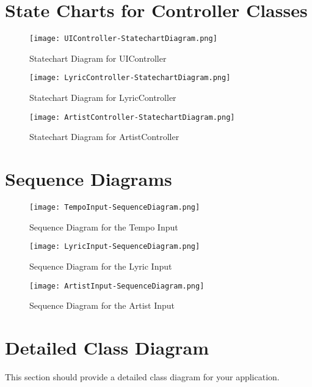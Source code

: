 \documentclass[]{article}
\begin{document}
\section{State Charts for Controller Classes}
\label{sec:state_charts_for_controller_classes}
\begin{figure}
	\centering
	\texttt{[image: UIController-StatechartDiagram.png]}
	\caption{Statechart Diagram for UIController}
	\label{fig:uicontroller_statechart}
\end{figure}
\begin{figure}
	\centering
	\texttt{[image: LyricController-StatechartDiagram.png]}
	\caption{Statechart Diagram for LyricController}
	\label{fig:uicontroller_statechart}
\end{figure}
\begin{figure}
	\centering
	\texttt{[image: ArtistController-StatechartDiagram.png]}
	\caption{Statechart Diagram for ArtistController}
	\label{fig:uicontroller_statechart}
\end{figure}
\FloatBarrier

\section{Sequence Diagrams}
\label{sec:sequence_diagrams}
\begin{figure}
	\centering
	\texttt{[image: TempoInput-SequenceDiagram.png]}
	\caption{Sequence Diagram for the Tempo Input}
	\label{fig:tempo_input_sequence}
\end{figure}

\begin{figure}
	\centering
	\texttt{[image: LyricInput-SequenceDiagram.png]}
	\caption{Sequence Diagram for the Lyric Input}
	\label{fig:lyric_input_sequence}
\end{figure}

\begin{figure}
	\centering
	\texttt{[image: ArtistInput-SequenceDiagram.png]}
	\caption{Sequence Diagram for the Artist Input}
	\label{fig:artist_input_sequence}
\end{figure}
\FloatBarrier

\section{Detailed Class Diagram}
\label{sec:detailed_class_diagram}
This section should provide a detailed class diagram for your application.
\end{document}
